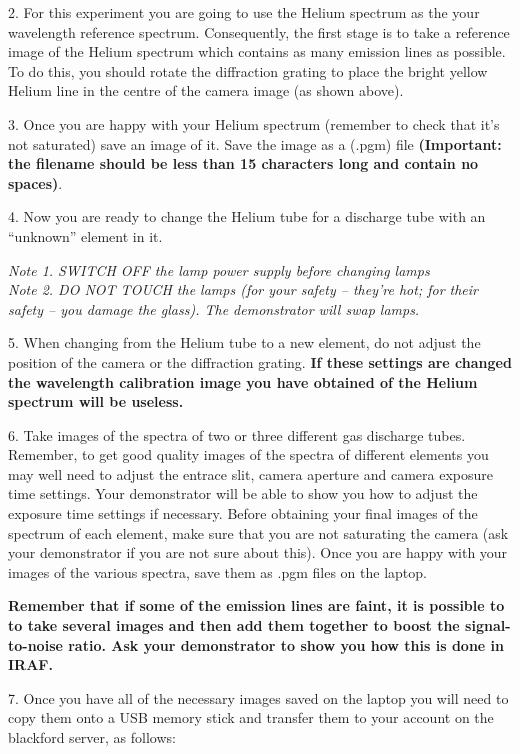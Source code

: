 \documentclass[12pt]{article}
\begin{document}
2. For this experiment you are going to use the Helium spectrum as the
   your wavelength reference spectrum. Consequently, the first stage
   is to take a reference image of the Helium spectrum which contains
   as many emission lines as possible. To do this, you should rotate
   the diffraction grating to place the bright yellow Helium line in
   the centre of the camera image (as shown above).

3. Once you are happy with your Helium spectrum (remember to check
   that it's not saturated) save an image of it. Save the image as a (.pgm)
   file {\bf(Important: the filename should be less than 15 characters long
   and contain no spaces)}.

4. Now you are ready to change the Helium tube for a discharge tube
   with an ``unknown'' element in it.

{\sl Note 1. SWITCH OFF the lamp power supply before changing lamps}\\
{\sl Note 2. DO NOT TOUCH the lamps (for your safety -- they're hot; 
for their safety -- you damage the glass). The demonstrator will swap 
lamps.}

\newpage

5. When changing from the Helium tube to a new element, do not adjust
   the position of the camera or the diffraction grating. {\bf If these
   settings are changed the wavelength calibration image you have
   obtained of the Helium spectrum will be useless.}


6. Take images of the spectra of two or three different gas discharge
   tubes. Remember, to get good quality images of the spectra of
   different elements you may well need to adjust the entrace slit,
   camera aperture and camera exposure time settings. Your
   demonstrator will be able to show you how to adjust the exposure
   time settings if necessary. Before obtaining your final images of
   the spectrum of each element, make sure that you are not saturating
   the camera (ask your demonstrator if you are not sure about
   this). Once you are happy with your images of the various spectra,
   save them as .pgm files on the laptop.

   {\bf Remember that if some of the emission lines are faint, it is possible to to take
several images and then add them together to boost the signal-to-noise
ratio. Ask your demonstrator to show you how this is done in IRAF.}



7. Once you have all of the necessary images saved on the laptop you will need to copy them onto a USB memory stick and transfer them to your account on the blackford server, as follows:
\end{document}
